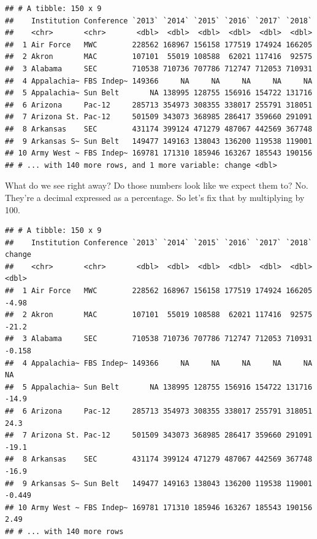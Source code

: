 \documentclass[]{book}
\newenvironment{Shaded}{\begin{snugshade}}{\end{snugshade}}
\newcommand{\KeywordTok}[1]{\textcolor[rgb]{0.13,0.29,0.53}{\textbf{#1}}}
\newcommand{\DataTypeTok}[1]{\textcolor[rgb]{0.13,0.29,0.53}{#1}}
\newcommand{\DecValTok}[1]{\textcolor[rgb]{0.00,0.00,0.81}{#1}}
\newcommand{\StringTok}[1]{\textcolor[rgb]{0.31,0.60,0.02}{#1}}
\newcommand{\OperatorTok}[1]{\textcolor[rgb]{0.81,0.36,0.00}{\textbf{#1}}}
\newcommand{\NormalTok}[1]{#1}
\begin{document}
\begin{verbatim}
## # A tibble: 150 x 9
##    Institution Conference `2013` `2014` `2015` `2016` `2017` `2018`
##    <chr>       <chr>       <dbl>  <dbl>  <dbl>  <dbl>  <dbl>  <dbl>
##  1 Air Force   MWC        228562 168967 156158 177519 174924 166205
##  2 Akron       MAC        107101  55019 108588  62021 117416  92575
##  3 Alabama     SEC        710538 710736 707786 712747 712053 710931
##  4 Appalachia~ FBS Indep~ 149366     NA     NA     NA     NA     NA
##  5 Appalachia~ Sun Belt       NA 138995 128755 156916 154722 131716
##  6 Arizona     Pac-12     285713 354973 308355 338017 255791 318051
##  7 Arizona St. Pac-12     501509 343073 368985 286417 359660 291091
##  8 Arkansas    SEC        431174 399124 471279 487067 442569 367748
##  9 Arkansas S~ Sun Belt   149477 149163 138043 136200 119538 119001
## 10 Army West ~ FBS Indep~ 169781 171310 185946 163267 185543 190156
## # ... with 140 more rows, and 1 more variable: change <dbl>
\end{verbatim}

What do we see right away? Do those numbers look like we expect them to?
No. They're a decimal expressed as a percentage. So let's fix that by
multiplying by 100.

\begin{Shaded}
\end{Shaded}

\begin{verbatim}
## # A tibble: 150 x 9
##    Institution Conference `2013` `2014` `2015` `2016` `2017` `2018`  change
##    <chr>       <chr>       <dbl>  <dbl>  <dbl>  <dbl>  <dbl>  <dbl>   <dbl>
##  1 Air Force   MWC        228562 168967 156158 177519 174924 166205  -4.98 
##  2 Akron       MAC        107101  55019 108588  62021 117416  92575 -21.2  
##  3 Alabama     SEC        710538 710736 707786 712747 712053 710931  -0.158
##  4 Appalachia~ FBS Indep~ 149366     NA     NA     NA     NA     NA  NA    
##  5 Appalachia~ Sun Belt       NA 138995 128755 156916 154722 131716 -14.9  
##  6 Arizona     Pac-12     285713 354973 308355 338017 255791 318051  24.3  
##  7 Arizona St. Pac-12     501509 343073 368985 286417 359660 291091 -19.1  
##  8 Arkansas    SEC        431174 399124 471279 487067 442569 367748 -16.9  
##  9 Arkansas S~ Sun Belt   149477 149163 138043 136200 119538 119001  -0.449
## 10 Army West ~ FBS Indep~ 169781 171310 185946 163267 185543 190156   2.49 
## # ... with 140 more rows
\end{verbatim}
\end{document}
